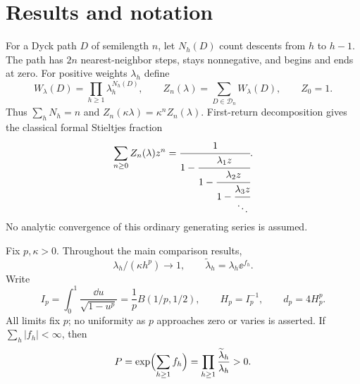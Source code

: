 \documentclass[11pt,letterpaper]{article}
\numberwithin{equation}{section}
\theoremstyle{remark}\newtheorem{remark}[theorem]{Remark}
\newcommand{\Dyck}{\mathcal D}
\begin{document}
\section{Results and notation}\label{pwd:rc:sec:results}
For a Dyck path $D$ of semilength $n$, let $N_h(D)$ count descents from $h$ to $h-1$. The path has $2n$ nearest-neighbor steps, stays nonnegative, and begins and ends at zero. For positive weights $\lambda_h$ define
\begin{equation}\label{pwd:rc:eq:definition}
 W_\lambda(D)=\prod_{h\ge1}\lambda_h^{N_h(D)},\qquad
 Z_n(\lambda)=\sum_{D\in\Dyck_n}W_\lambda(D),\qquad Z_0=1.
\end{equation}
Thus $\sum_hN_h=n$ and $Z_n(\kappa\lambda)=\kappa^nZ_n(\lambda)$. First-return decomposition gives the classical formal Stieltjes fraction \cite{flajolet}
\[
 \sum_{n\ge0}Z_n(\lambda)z^n
 =\cfrac1{1-\cfrac{\lambda_1z}{1-\cfrac{\lambda_2z}{1-\cfrac{\lambda_3z}{\ddots}}}}.
\]
No analytic convergence of this ordinary generating series is assumed.

Fix $p,\kappa>0$. Throughout the main comparison results,
\begin{equation}\label{pwd:rc:eq:asymptotic}
 \lambda_h/(\kappa h^p)\longrightarrow1,\qquad
 \widetilde\lambda_h=\lambda_h\ee^{f_h}.
\end{equation}
Write
\begin{equation}\label{pwd:rc:eq:constants}
 I_p=\int_0^1\frac{\dd u}{\sqrt{1-u^p}}
 =\frac1p B(1/p,1/2),\qquad H_p=I_p^{-1},\qquad d_p=4H_p^p.
\end{equation}
All limits fix $p$; no uniformity as $p$ approaches zero or varies is asserted. If $\sum_h|f_h|<\infty$, then
\[
 P=\exp\Bigl(\sum_{h\ge1}f_h\Bigr)
  =\prod_{h\ge1}\frac{\widetilde\lambda_h}{\lambda_h}>0.
\]
\end{document}
